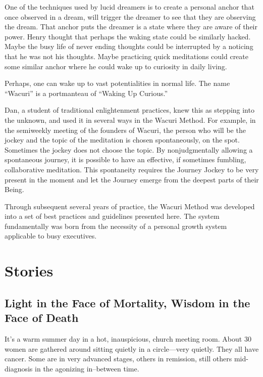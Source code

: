 \documentclass[12pt]{book}
\begin{document}
One of the techniques used by lucid dreamers is to create a personal anchor that once observed in a dream, will trigger the dreamer to see that they are observing the dream. That anchor puts the dreamer is a state where they are aware of their power. Henry thought that perhaps the waking state could be similarly hacked. Maybe the busy life of never ending thoughts could be interrupted by a noticing that he was not his thoughts. Maybe practicing quick meditations could create some similar anchor where he could wake up to curiosity in daily living.
					
Perhaps, one can wake up to vast potentialities in normal life. The name ``Wacuri'' is a portmanteau of ``Waking Up Curious.''
					
Dan, a student of traditional enlightenment practices, knew this as stepping into the unknown, and used it in several ways in the Wacuri Method. For example, in the semiweekly meeting of the founders of Wacuri, the person who will be the jockey and the topic of the meditation is chosen spontaneously, on the spot. Sometimes the jockey does not choose the topic. By nonjudgmentally allowing a spontaneous journey, it is possible to have an effective, if sometimes fumbling, collaborative meditation. This spontaneity requires the Journey Jockey to be very present in the moment and let the Journey emerge from the deepest parts of their Being.
					
Through subsequent several years of practice, the Wacuri Method was developed into a set of best practices and guidelines presented here. The system fundamentally was born from the necessity of a personal growth system applicable to busy executives.
				
			
	

\chapter{Stories}

\section{Light in the Face of Mortality, Wisdom in the Face of Death}
					


It's a warm summer day in a hot, inauspicious, church meeting
room. About 30 women are gathered around sitting quietly in a
circle---very quietly. They all have cancer. Some are in very advanced
stages, others in remission, still others mid-diagnosis in the
agonizing in--between time.
\end{document}
